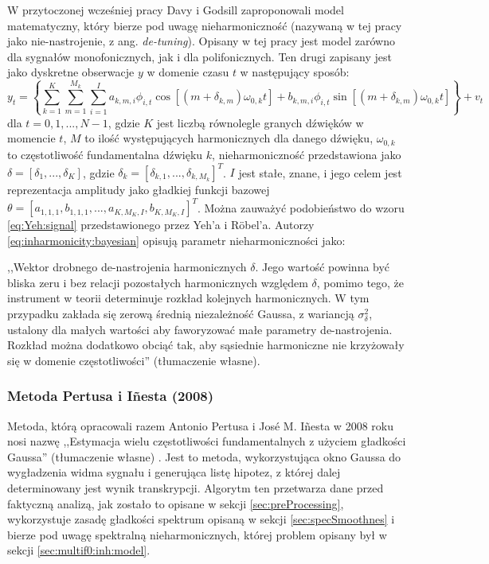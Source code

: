 \documentclass[12pt,a4paper,twoside]{mwart}
\begin{document}
W przytoczonej wcześniej pracy 
\cite[1-10]{Transcription:BayesianHarmonicModels}
Davy i Godsill zaproponowali model matematyczny, który bierze pod uwagę nieharmoniczność (nazywaną w tej pracy jako nie-nastrojenie, z ang. \textit{de-tuning}). Opisany w tej pracy jest model zarówno dla sygnałów monofonicznych, jak i dla polifonicznych. Ten drugi zapisany jest jako dyskretne obserwacje $y$ w domenie czasu $t$ w następujący sposób:
\begin{equation}\label{eq:inharmonicity:bayesian}
  y_t = \left\{ \sum_{k=1}^{K}\sum_{m=1}^{M_k}\sum_{i=1}^{I} a_{k,m,i} \phi_{i,t}\cos[(m + \delta_{k,m})\omega_{0,k}t] + b_{k,m,i}\phi_{i,t}\sin[(m + \delta_{k,m})\omega_{0,k}t]\right\} + v_t
\end{equation}
dla $t = 0,1,...,N-1$, gdzie $K$ jest liczbą równolegle granych dźwięków w momencie $t$, $M$ to ilość występujących harmonicznych dla danego dźwięku, $\omega_{0,k}$ to częstotliwość fundamentalna dźwięku $k$, nieharmoniczność przedstawiona jako $\delta = [\delta_1, ..., \delta_K]$, gdzie $\delta_k = [\delta_{k,1}, ..., \delta_{k, M_{k}}]^T$. $I$ jest stałe, znane, i jego celem jest reprezentacja amplitudy jako gładkiej funkcji bazowej $\theta = [a_{1,1,1}, b_{1,1,1}, ..., a_{K, M_{K},I}, b_{K, M_{K},I}]^T$. Można zauważyć podobieństwo do wzoru  \ref{eq:Yeh:signal} przedstawionego przez Yeh'a i Röbel'a. Autorzy \ref{eq:inharmonicity:bayesian} opisują parametr nieharmoniczności jako:
\begin{displayquote}
,,Wektor drobnego de-nastrojenia harmonicznych $\delta$. Jego wartość powinna być bliska zeru i bez relacji pozostałych harmonicznych względem $\delta$, pomimo tego, że instrument w teorii determinuje rozkład kolejnych harmonicznych. W tym przypadku zakłada się zerową średnią niezależność Gaussa, z wariancją $\sigma_{\delta}^{2}$, ustalony dla małych wartości aby faworyzować małe parametry de-nastrojenia. Rozkład można dodatkowo obciąć tak, aby sąsiednie harmoniczne nie krzyżowały się w domenie częstotliwości'' 
\cite[9]{Transcription:BayesianHarmonicModels}
(tłumaczenie własne).
\end{displayquote}
\subsubsection{Metoda Pertusa i Iñesta (2008)} \label{sec:pertus1}
Metoda, którą opracowali razem Antonio Pertusa i José M. Iñesta w 2008 roku nosi nazwę ,,Estymacja wielu częstotliwości fundamentalnych z użyciem gładkości Gaussa'' (tłumaczenie własne) \cite{Transcription:Pertus:Inharmonicity}. Jest to metoda, wykorzystująca okno Gaussa do wygładzenia widma sygnału i generująca listę hipotez, z której dalej determinowany jest wynik transkrypcji. Algorytm ten przetwarza dane przed faktyczną analizą, jak zostało to opisane w sekcji \ref{sec:preProcessing}, wykorzystuje zasadę gładkości spektrum opisaną w sekcji \ref{sec:specSmoothnes} i bierze pod uwagę spektralną nieharmonicznych, której problem opisany był w sekcji \ref{sec:multif0:inh:model}.
\end{document}
